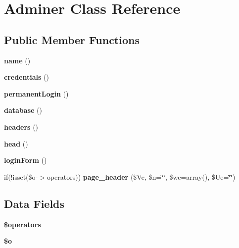 \section{Adminer Class Reference}
\label{class_adminer}
\subsection*{Public Member Functions}
\begin{DoxyCompactItemize}
\item 
{\bfseries name} ()\label{class_adminer_a4b516aaa5fa38da4fed24ab6001627e2}

\item 
{\bfseries credentials} ()\label{class_adminer_ae4dbe803fc0e9c7316137599d79b00ab}

\item 
{\bfseries permanentLogin} ()\label{class_adminer_a6bfb91ef00404cf87d548e2f3357dc7e}

\item 
{\bfseries database} ()\label{class_adminer_a8f84d74d0c60c6a48d4be43c605fb2c9}

\item 
{\bfseries headers} ()\label{class_adminer_acf17788084df5a3d3415f4d9e346471d}

\item 
{\bfseries head} ()\label{class_adminer_ab4bb77d19c2f3d6b53e20be06e3515bd}

\item 
{\bfseries loginForm} ()\label{class_adminer_a82bd519619b38f88763e0ecc29ba4630}

\item 
if(!isset(\$o-\/$>$operators)) {\bfseries page\_\-header} (\$Ve, \$n=\char`\"{}\char`\"{}, \$wc=array(), \$Ue=\char`\"{}\char`\"{})\label{class_adminer_a5a223d9cae89bd6b4572e1e2404cbde7}

\end{DoxyCompactItemize}
\subsection*{Data Fields}
\begin{DoxyCompactItemize}
\item 
{\bfseries \$operators}\label{class_adminer_a1a526a18e63270ba6814d699637f22bf}

\item 
{\bfseries \$o}
\end{DoxyCompactItemize}


